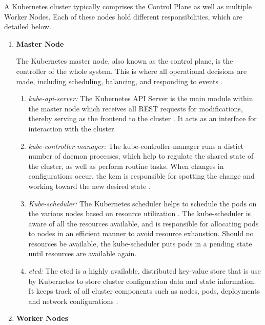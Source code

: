 A Kubernetes cluster typically comprises the Control Plane as well as multiple Worker Nodes. Each of these nodes hold different responsibilities, which are detailed below.


\begin{enumerate}
    \vspace{-1em}
        \item \textbf{Master Node}

        The Kubernetes master node, also known as the control plane, is the controller of the whole system. This is where all operational decisions are made, including scheduling, balancing, and responding to events \cite{dinu-2025C}.  
        \begin{enumerate}
            \item \textit{kube-api-server:} The Kubernetes API Server is the main module within the master node which receives all REST requests for modifications, thereby serving as the frontend to the cluster \cite{bindlish-2021}. It acts as an interface for interaction with the cluster. 
            \item \textit{kube-controller-manager:} The kube-controller-manager runs a distict number of daemon processes, which help to regulate the shared state of the cluster, as well as perform routine tasks. When changes in configurations occur, the kcm is responsible for spotting the change and working toward the new desired state \cite{bindlish-2021}. 
            \item \textit{Kube-scheduler:}  The Kubernetes scheduler helps to schedule the pods on the various nodes based on resource utilization \cite{bindlish-2021}. The kube-scheduler is aware of all the resources available, and is responsible for allocating pods to nodes in an efficient manner to avoid resource exhaustion. Should no resources be available, the kube-scheduler puts pods in a pending state until resources are available again.
            \item \textit{etcd:} The etcd is a highly available, distributed key-value store that is use by Kubernetes to store cluster configuration data and state information. It keeps track of all cluster components such as nodes, pods, deployments and network configurations \cite{ibm-2025}. 
        \end{enumerate}
        \item \textbf{Worker Nodes}


\end{enumerate}
